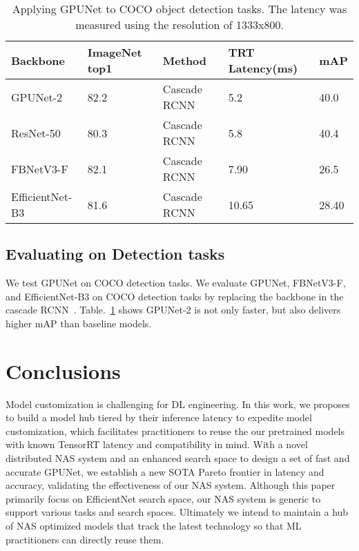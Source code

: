 \documentclass[10pt,twocolumn,letterpaper]{article}
\begin{document}
\begin{table}[!tb]
\footnotesize
\setlength{\tabcolsep}{0.2em}
  \centering
    \begin{tabular}{l l l l l }
          \toprule
          {Backbone}    & ImageNet top1 & {Method} & TRT Latency(ms) & mAP \\
          \midrule
          GPUNet-2      & 82.2 &  Cascade RCNN & 5.2 & 40.0      \\
          ResNet-50     & 80.3 &  Cascade RCNN & 5.8 & 40.4      \\
          FBNetV3-F     & 82.1 &  Cascade RCNN & 7.90 & 26.5     \\
          EfficientNet-B3 & 81.6 &  Cascade RCNN & 10.65 & 28.40 \\
          \bottomrule
    \end{tabular}
     \caption{Applying GPUNet to COCO object detection tasks. The latency was measured using the resolution of 1333x800.}
     \label{table:gpunet_coco}
\end{table}

\subsection{Evaluating on Detection tasks}
We test GPUNet on COCO detection tasks. We evaluate GPUNet, FBNetV3-F, and EfficientNet-B3 on COCO detection tasks by replacing the backbone in the cascade RCNN~\cite{cai2018cascade}. Table.~\ref{table:gpunet_coco} shows GPUNet-2 is not only faster, but also delivers higher mAP than baseline models.

\section{Conclusions}
Model customization is challenging for DL engineering. In this work, we proposes to build a model hub tiered by their inference latency to expedite model customization, which facilitates practitioners to reuse the our pretrained models with known TensorRT latency and compatibility in mind. With a novel distributed NAS system and an enhanced search space to design a set of fast and accurate GPUNet, we establish a new SOTA Pareto frontier in latency and accuracy, validating the effectiveness of our NAS system. Although this paper primarily focus on EfficientNet search space, our NAS system is generic to support various tasks and search spaces. Ultimately we intend to maintain a hub of NAS optimized models that track the latest technology so that ML practitioners can directly reuse them.
\end{document}
